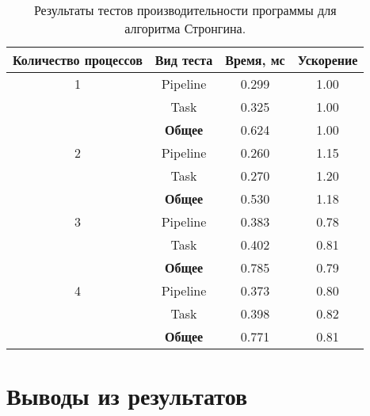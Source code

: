\documentclass[a4paper,12pt]{article}
\begin{document}
\begin{table}[h!]
\begin{tabular}{cccc}
\toprule
\textbf{Количество процессов} & \textbf{Вид теста}         & \textbf{Время, мс} & \textbf{Ускорение} \\ 
\midrule
1                             & Pipeline                   & 0.299              & 1.00               \\ 
                              & Task                      & 0.325              & 1.00               \\ 
                              \cmidrule(lr){2-4}
                              & \textbf{Общее}            & 0.624              & 1.00               \\ 
\midrule
2                             & Pipeline                   & 0.260              & 1.15               \\ 
                              & Task                      & 0.270              & 1.20               \\ 
                              \cmidrule(lr){2-4}
                              & \textbf{Общее}            & 0.530              & 1.18               \\ 
\midrule
3                             & Pipeline                   & 0.383              & 0.78               \\ 
                              & Task                      & 0.402              & 0.81               \\ 
                              \cmidrule(lr){2-4}
                              & \textbf{Общее}            & 0.785              & 0.79               \\ 
\midrule
4                             & Pipeline                   & 0.373              & 0.80               \\ 
                              & Task                      & 0.398              & 0.82               \\ 
                              \cmidrule(lr){2-4}
                              & \textbf{Общее}            & 0.771              & 0.81               \\ 
\bottomrule
\end{tabular}
\caption{Результаты тестов производительности программы для алгоритма Стронгина.}
\label{table:performance}
\end{table}

\section{Выводы из результатов}
\end{document}
